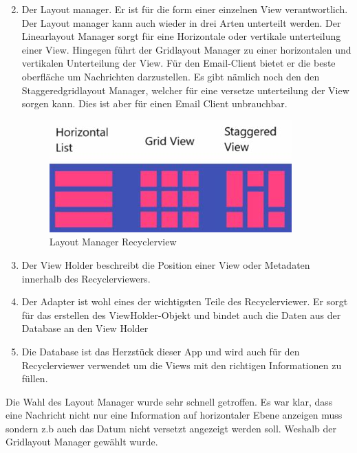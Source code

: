 \documentclass[a4paper,11pt]{article}
\begin{document}
\begin{enumerate}

    \setcounter{enumi}{1}
    \item Der Layout manager. Er ist für die form einer einzelnen View verantwortlich. 
Der Layout manager kann auch wieder in drei Arten unterteilt werden. Der Linearlayout Manager sorgt für eine 
Horizontale oder vertikale unterteilung einer View. Hingegen führt der Gridlayout Manager zu einer horizontalen 
und vertikalen Unterteilung der View. Für den Email-Client bietet er die  
beste oberfläche um Nachrichten darzustellen. Es gibt nämlich noch den den Staggeredgridlayout Manager, welcher 
für eine versetze unterteilung der View sorgen kann. Dies ist aber für einen Email Client unbrauchbar. 

\begin{figure}[H]
    \centering
    \includegraphics[width=.4\textwidth]{media/RecyclerviewLayoutManagerCropt.jpeg}
    \caption{Layout Manager Recyclerview \cite{LayoutManagerPicture}}
\end{figure}

    \item Der View Holder beschreibt die Position einer View oder Metadaten innerhalb des Recyclerviewers.

    \item Der Adapter ist wohl eines der wichtigsten Teile des Recyclerviewer. Er sorgt für das erstellen des ViewHolder-Objekt und
bindet auch die Daten aus der Database an den View Holder

    \item Die Database ist das Herzstück dieser App und wird auch für den Recyclerviewer verwendet um die 
Views mit den richtigen Informationen zu füllen. 

\end{enumerate}

Die Wahl des Layout Manager wurde sehr schnell getroffen. Es war klar, dass eine Nachricht nicht nur eine Information auf horizontaler Ebene anzeigen muss sondern
z.b auch das Datum nicht versetzt angezeigt werden soll. Weshalb der Gridlayout Manager gewählt wurde. 

\end{document}
